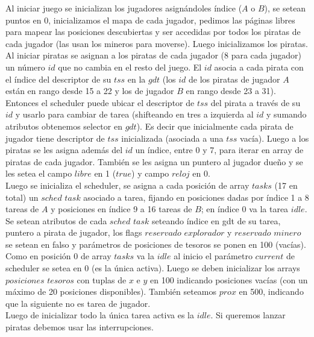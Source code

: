 Al iniciar juego se inicializan los jugadores asignándoles índice ($A$ o $B$), se setean puntos en 0, 
inicializamos el mapa de cada jugador, pedimos las páginas libres para mapear las posiciones descubiertas y ser 
accedidas por todos los piratas de cada jugador (las usan los mineros para moverse). Luego inicializamos los 
piratas.\\
Al iniciar piratas se asignan a los piratas de cada jugador (8 para cada jugador) un número $id$ que no cambia en 
el resto del juego. El $id$ asocia a cada pirata con el índice del descriptor de su $tss$ en la $gdt$ (los $id$ 
de los piratas de jugador $A$ están en rango desde 15 a 22 y los de jugador $B$ en rango desde 23 a 31). Entonces
el scheduler puede ubicar el descriptor de $tss$ del pirata a través de su $id$ y usarlo para cambiar de tarea
(shifteando en tres a izquierda al $id$ y sumando atributos obtenemos selector en $gdt$). Es decir que 
inicialmente cada pirata de jugador tiene descriptor de $tss$ inicializada (asociada a una
$tss$ vacía). Luego a los piratas se les asigna además del $id$ un índice, entre 0 y 7, para iterar en array
de piratas de cada jugador. También se les asigna un puntero al jugador dueño y se les setea el campo $libre$ 
en 1 ($true$) y campo $reloj$ en 0.\\
    
Luego se inicializa el scheduler, se asigna a cada posición de array $tasks$ (17 en total) un $sched$ $task$ 
asociado a tarea, fijando en posiciones dadas por índice 1 a 8 tareas de $A$ y posiciones en índice 9 a 16 
tareas de $B$; en índice 0 va la tarea $idle$.
Se setean atributos de cada $sched$ $task$ seteando índice en gdt de su tarea, puntero a pirata de jugador, los 
flags $reservado$ $explorador$ y $reservado$ $minero$ se setean en falso y parámetros de posiciones de tesoros se 
ponen en 100 (vacías). 
Como en posición 0 de array $tasks$ va la $idle$ al inicio el parámetro $current$ de scheduler
 se setea en 0 (es la única activa).
Luego se deben inicializar los arrays $posiciones$ $tesoros$ con tuplas de $x$ e $y$ en 100 indicando 
posiciones vacías (con un máximo de 20 posiciones disponibles). También seteamos $prox$ en 500, indicando que
la siguiente no es tarea de jugador.\\

Luego de inicializar todo la única tarea activa es la $idle$. Si queremos lanzar piratas debemos usar las 
interrupciones.


